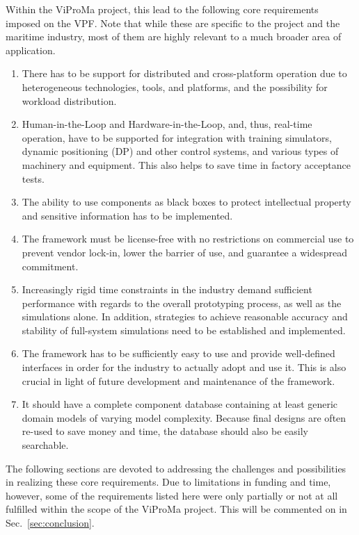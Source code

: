\documentclass[prb,aps,showpacs,floatfix,twocolumn,10pt]{revtex4-1}
\theoremstyle{plain}
\theoremstyle{remark}
\begin{document}
Within the ViProMa project, this lead to the following core requirements imposed on the VPF.
Note that while these are specific to the project and the maritime industry, most of them are highly relevant to a much broader area of application.
\begin{enumerate}
	\item There has to be support for distributed and cross-platform operation due to heterogeneous technologies, tools, and platforms, and the possibility for workload distribution.
	\item Human-in-the-Loop and Hardware-in-the-Loop, and, thus, real-time operation, have to be supported for integration with training simulators, dynamic positioning (DP) and other control systems, and various types of machinery and equipment.
	This also helps to save time in factory acceptance tests.
	\item The ability to use components as black boxes to protect intellectual property and sensitive information has to be implemented.
	\item The framework must be license-free with no restrictions on commercial use to prevent vendor lock-in, lower the barrier of use, and guarantee a widespread commitment.
	\item Increasingly rigid time constraints in the industry demand sufficient performance with regards to the overall prototyping process, as well as the simulations alone.
	In addition, strategies to achieve reasonable accuracy and stability of full-system simulations need to be established and implemented.
	\item The framework has to be sufficiently easy to use and provide well-defined interfaces in order for the industry to actually adopt and use it.
	This is also crucial in light of future development and maintenance of the framework.
	\item It should have a complete component database containing at least generic domain models of varying model complexity.
	Because final designs are often re-used to save money and time, the database should also be easily searchable.
\end{enumerate}
The following sections are devoted to addressing the challenges and possibilities in realizing these core requirements.
Due to limitations in funding and time, however, some of the requirements listed here were only partially or not at all fulfilled within the scope of the ViProMa project.
This will be commented on in Sec.~\ref{sec:conclusion}.
\end{document}
